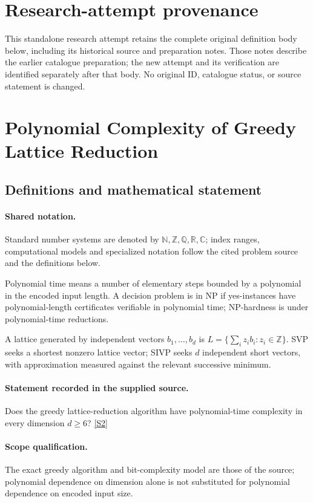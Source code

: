 \documentclass[11pt]{article}
\begin{document}
\section*{Research-attempt provenance}
This standalone research attempt retains the complete original definition body below,
including its historical source and preparation notes. Those notes describe the
earlier catalogue preparation; the new attempt and its verification are identified
separately after that body. No original ID, catalogue status, or source statement is changed.

\section{Polynomial Complexity of Greedy Lattice Reduction}\label{statement}

\subsection{Definitions and mathematical statement}

\paragraph{Shared notation.}Standard number systems are denoted by $\mathbb N,\mathbb Z,\mathbb Q,\mathbb R,\mathbb C$; index ranges, computational models and specialized notation follow the cited problem source and the definitions below.


Polynomial time means a number of elementary steps bounded by a polynomial in the encoded input length. A decision problem is in $\mathrm{NP}$ if yes-instances have polynomial-length certificates verifiable in polynomial time; NP-hardness is under polynomial-time reductions.

A lattice generated by independent vectors $b_1,\ldots,b_d$ is $L=\{\sum_i z_i b_i:z_i\in\mathbb Z\}$. SVP seeks a shortest nonzero lattice vector; SIVP seeks $d$ independent short vectors, with approximation measured against the relevant successive minimum.
\paragraph{Statement recorded in the supplied source.}
Does the greedy lattice-reduction algorithm have polynomial-time complexity in every dimension $d\geq6$? \href{https://doi.org/10.4171/owr/2005/01}{[S2]}
\paragraph{Scope qualification.}
The exact greedy algorithm and bit-complexity model are those of the source; polynomial dependence on dimension alone is not substituted for polynomial dependence on encoded input size.
\end{document}
